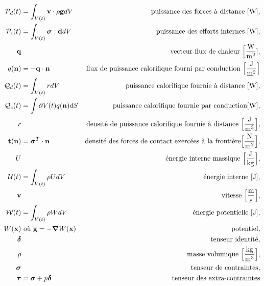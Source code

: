 \begin{align*}
    \mathcal{P}_d(t) &= \int_{V(t)} \vb{v} \cdot \rho \vb{g} dV & \textrm{puissance des forces à distance } [\si{W}], \\
    \mathcal{P}_i(t) &= \int_{V(t)} \boldsymbol{\sigma} : \vb{d} dV & \textrm{puissance des efforts internes } [\si{W}],\\
    \vb{q} & & \textrm{vecteur flux de chaleur } \Big[\si{\frac{W}{m^2}}], \\
    q(\vb{n}) &= - \vb{q} \cdot \vb{n} & \textrm{flux de puissance calorifique fourni par conduction } \Big[\si{\frac{J}{m^2}}\Big]\\
    \mathcal{Q}_d(t) &= \int_{V(t)} r dV & \textrm{puissance calorifique fournie à distance } [\si{W}], \\
    \mathcal{Q}_c(t) &= \int{\partial V(t)} q(\vb{n}) dS & \textrm{puissance calorifique fournie par conduction} [\si{W}], \\
    r & & \textrm{densité de puissance calorifique fournie à distance } \Big[\si{\frac{J}{m^3}}\Big],\\
    \vb{t}(\vb{n}) &= \boldsymbol{\sigma}^T \cdot \vb{n} & \textrm{densité des forces de contact exercées à la frontière} \Big[\si{\frac{N}{m^2}}\Big],\\
    U & & \textrm{énergie interne massique } \Big[\si{\frac{J}{kg}}\Big],\\
    \mathcal{U}(t) &= \int_{V(t)} \rho U dV & \textrm{énergie interne } [\si{J}],\\
    \vb{v} & & \textrm{vitesse } \Big[\si{\frac{m}{s}}\Big],\\
    \mathcal{W}(t) &= \int_{V(t)} \rho W dV & \textrm{énergie potentielle } [\si{J}],\\
    W(\vb{x}) & \textrm{ où } \vb{g} = -\grad W(\vb{x}) & \textrm{potentiel,}\\
    \boldsymbol{\delta} & & \textrm{tenseur identité,}\\
    \rho & & \textrm{masse volumique } \Big[\si{\frac{kg}{m^3}}\Big],\\
    \boldsymbol{\sigma} & & \textrm{tenseur de contraintes,}\\
    \boldsymbol{\tau} &= \boldsymbol{\sigma} + p \boldsymbol{\delta} & \textrm{tenseur des extra-contraintes}
  \end{align*}
  \endgroup
